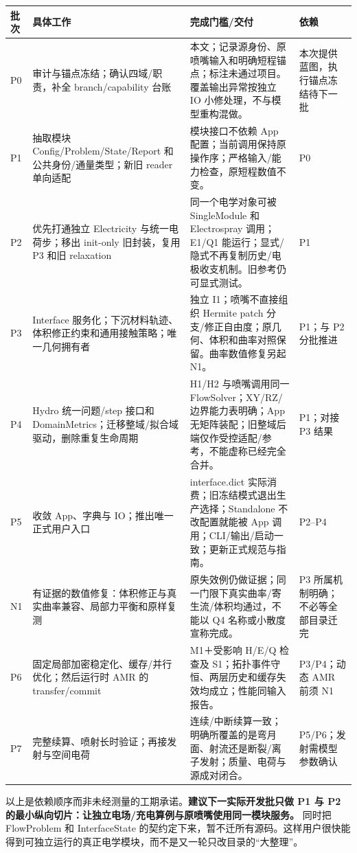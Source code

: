 \documentclass[UTF8,a4paper,11pt,fontset=fandol]{ctexart}
\numberwithin{equation}{section}
\begin{document}
\begin{longtable}{@{}P{.08\textwidth}P{.28\textwidth}P{.36\textwidth}P{.20\textwidth}@{}}
\toprule 批次 & 具体工作 & 完成门槛/交付 & 依赖\\\midrule\endhead
P0 & 审计与锚点冻结；确认四域/职责，补全 branch/capability 台账 & 本文；记录源身份、原喷嘴输入和明确短程锚点；标注未通过项目。覆盖输出异常按独立 IO 小修处理，不与模型重构混做。 & 本次提供蓝图，执行锚点冻结待下一批\\
P1 & 抽取模块 Config/Problem/State/Report 和公共身份/通量类型；新旧 reader 单向适配 & 模块接口不依赖 App 配置；当前调用保持原操作序；严格输入/能力检查，原短程数值不变。 & P0\\
P2 & 优先打通独立 Electricity 与统一电荷步；移出 init-only 旧封装，复用 P3 和旧 relaxation & 同一个电学对象可被 SingleModule 和 Electrospray 调用；E1/Q1 能运行；显式/隐式不再复制历史/电极收支机制。旧参考仍可显式测试。 & P1\\
P3 & Interface 服务化；下沉材料轨迹、体积修正约束和通用接触策略；唯一几何拥有者 & 独立 I1；喷嘴不直接组织 Hermite patch 分支/修正自由度；原几何、体积和曲率对照保留。曲率数值修复另起 N1。 & P1；与 P2 分批推进\\
P4 & Hydro 统一问题/step 接口和 DomainMetrics；迁移整域/拟合域驱动，删除重复生命周期 & H1/H2 与喷嘴调用同一 FlowSolver；XY/RZ/边界能力表明确；App 无矩阵装配；旧整域后端仅作受控适配/参考，不能虚称已经完全合并。 & P1；对接 P3 结果\\
P5 & 收敛 App、字典与 IO；推出唯一正式用户入口 & interface.dict 实际消费；旧冻结模式退出生产选择；Standalone 不改配置就能被 App 调用；CLI/输出/启动一致；更新正式规范与指南。 & P2--P4\\
N1 & 有证据的数值修复：体积修正与真实曲率兼容、局部力平衡和原样复测 & 原失效例仍做证据；同一门限下真实曲率/寄生流/体积均通过，不能以 Q4 名称或小散度宣称完成。 & P3 所属机制明确；不必等全部目录迁完\\
P6 & 固定局部加密稳定化、缓存/并行优化；然后运行时 AMR 的 transfer/commit & M1＋受影响 H/E/Q 检查及 S1；拓扑事件守恒、两层历史和缓存失效均成立；性能同输入报告。 & P3/P4；动态 AMR 前须 N1\\
P7 & 完整续算、喷射长时验证；再接发射与空间电荷 & 连续/中断续算一致；明确所覆盖的是弯月面、射流还是断裂/离子发射；质量、电荷与源成对闭合。 & P5/P6；发射需模型参数确认\\
\bottomrule
\end{longtable}

以上是依赖顺序而非未经测量的工期承诺。\textbf{建议下一实际开发批只做 P1 与 P2 的最小纵向切片：让独立电场/充电算例与原喷嘴使用同一模块服务。} 同时把 FlowProblem 和 InterfaceState 的契约定下来，暂不迁所有源码。这样用户很快能得到可独立运行的真正电学模块，而不是又一轮只改目录的“大整理”。
\end{document}
